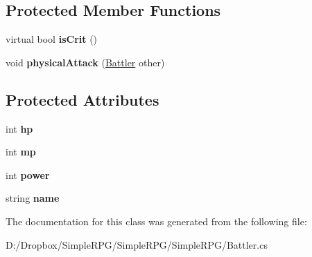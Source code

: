 \subsection*{Protected Member Functions}
\begin{DoxyCompactItemize}
\item 
\hypertarget{class_simple_r_p_g_1_1_battler_a57e2a41105489240317dce088fc37c0f}{virtual bool {\bfseries is\+Crit} ()}\label{class_simple_r_p_g_1_1_battler_a57e2a41105489240317dce088fc37c0f}

\item 
\hypertarget{class_simple_r_p_g_1_1_battler_a98b5d4af74f16aad0441c9429f2b9075}{void {\bfseries physical\+Attack} (\hyperlink{class_simple_r_p_g_1_1_battler}{Battler} other)}\label{class_simple_r_p_g_1_1_battler_a98b5d4af74f16aad0441c9429f2b9075}

\end{DoxyCompactItemize}
\subsection*{Protected Attributes}
\begin{DoxyCompactItemize}
\item 
\hypertarget{class_simple_r_p_g_1_1_battler_a07c64ffcc5fa74966f73c390b4730cbf}{int {\bfseries hp}}\label{class_simple_r_p_g_1_1_battler_a07c64ffcc5fa74966f73c390b4730cbf}

\item 
\hypertarget{class_simple_r_p_g_1_1_battler_a7d365863a653e2e113e013da68a3c448}{int {\bfseries mp}}\label{class_simple_r_p_g_1_1_battler_a7d365863a653e2e113e013da68a3c448}

\item 
\hypertarget{class_simple_r_p_g_1_1_battler_ad58a5b26c1489837ee06e85ea9525695}{int {\bfseries power}}\label{class_simple_r_p_g_1_1_battler_ad58a5b26c1489837ee06e85ea9525695}

\item 
\hypertarget{class_simple_r_p_g_1_1_battler_a2e7e9847ed0a9db282e0369964692034}{string {\bfseries name}}\label{class_simple_r_p_g_1_1_battler_a2e7e9847ed0a9db282e0369964692034}

\end{DoxyCompactItemize}


The documentation for this class was generated from the following file\+:\begin{DoxyCompactItemize}
\item 
D\+:/\+Dropbox/\+Simple\+R\+P\+G/\+Simple\+R\+P\+G/\+Simple\+R\+P\+G/Battler.\+cs\end{DoxyCompactItemize}
